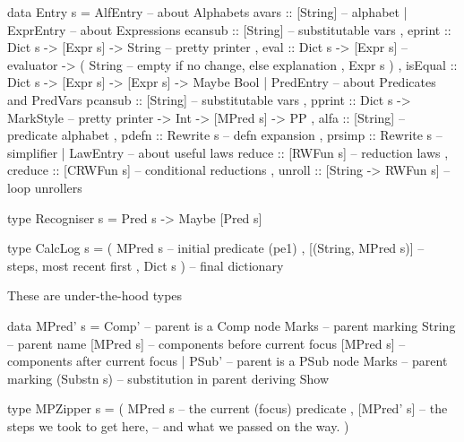 \begin{code}
data Entry s =
   AlfEntry {   -- about Alphabets
    avars   :: [String]  -- alphabet
   }
 | ExprEntry { -- about Expressions
     ecansub :: [String]                   -- substitutable vars
   , eprint  :: Dict s -> [Expr s] -> String   -- pretty printer
   , eval    :: Dict s -> [Expr s]                  -- evaluator
             -> ( String -- empty if no change, else explanation
                , Expr s )
   , isEqual :: Dict s -> [Expr s] -> [Expr s] -> Maybe Bool
   }
 | PredEntry {    -- about Predicates and PredVars
     pcansub :: [String]                      -- substitutable vars
   , pprint  :: Dict s -> MarkStyle           -- pretty printer
             -> Int -> [MPred s]
             -> PP
   , alfa :: [String]  -- predicate alphabet
   , pdefn   :: Rewrite s                    -- defn expansion
   , prsimp  :: Rewrite s                    -- simplifier
   }
 | LawEntry {  -- about useful laws
     reduce  :: [RWFun s]            -- reduction laws
   , creduce :: [CRWFun s]           -- conditional reductions
   , unroll  :: [String -> RWFun s]  -- loop unrollers
   }
\end{code}

\begin{code}
type Recogniser s = Pred s -> Maybe [Pred s]
\end{code}

\begin{code}
type CalcLog s = ( MPred s      -- initial predicate (pe1)
                 , [(String, MPred s)] -- steps, most recent first
                 , Dict s )     -- final dictionary
\end{code}


\newpage

These are under-the-hood types
\begin{code}
data MPred' s
 = Comp'         -- parent is a Comp node
     Marks       -- parent marking
     String      -- parent name
     [MPred s] -- components before current focus
     [MPred s] -- components after current focus
 | PSub'         -- parent is a PSub node
     Marks       -- parent marking
     (Substn s)  -- substitution in parent
 deriving Show
\end{code}

\begin{code}
type MPZipper s
  = ( MPred s    -- the current (focus) predicate
    , [MPred' s] -- the steps we took to get here,
                   -- and what we passed on the way.
    )
\end{code}


